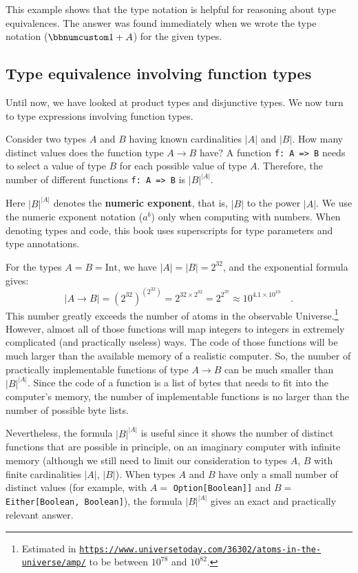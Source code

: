 This example shows that the type notation is helpful for reasoning
about type equivalences. The answer was found immediately when we
wrote the type notation ($\bbnum 1+A$) for the given types.

\subsection{Type equivalence involving function types}

Until now, we have looked at product types and disjunctive types.
We now turn to type expressions involving function types.

Consider two types $A$ and $B$ having known cardinalities $\left|A\right|$
and $\left|B\right|$. How many distinct values does the function
type $A\rightarrow B$ have? A function \lstinline!f: A => B! needs
to select a value of type $B$ for each possible value of type $A$.
Therefore, the number of different functions \lstinline!f: A => B!
is $\left|B\right|^{\left|A\right|}$. 

Here $\left|B\right|^{\left|A\right|}$ denotes the \textbf{numeric
exponent}, that is, $\left|B\right|$ to the power
$\left|A\right|$. We use the numeric exponent notation ($a^{b}$)
only when computing with numbers. When denoting types and code, this
book uses superscripts for type parameters and type annotations.

For the types $A=B=\text{Int}$, we have $\left|A\right|=\left|B\right|=2^{32}$,
and the exponential formula gives:
\[
\left|A\rightarrow B\right|=(2^{32})^{\left(2^{32}\right)}=2^{32\times2^{32}}=2^{2^{37}}\approx10^{4.1\times10^{10}}\quad.
\]
This number greatly exceeds the number of atoms in the observable
Universe.\footnote{Estimated in \texttt{\href{https://www.universetoday.com/36302/atoms-in-the-universe/amp/}{https://www.universetoday.com/36302/atoms-in-the-universe/amp/}}
to be between $10^{78}$ and $10^{82}$.} However, almost all of those functions will map integers to integers
in extremely complicated (and practically useless) ways. The code
of those functions will be much larger than the available memory of
a realistic computer. So, the number of practically implementable
functions of type $A\rightarrow B$ can be much smaller than $\left|B\right|^{\left|A\right|}$.
Since the code of a function is a list of bytes that needs to fit
into the computer\textsf{'}s memory, the number of implementable functions
is no larger than the number of possible byte lists.

Nevertheless, the formula $\left|B\right|^{\left|A\right|}$ is useful
since it shows the number of distinct functions that are possible
in principle, on an imaginary computer with infinite memory (although
we still need to limit our consideration to types $A$, $B$ with
finite cardinalities $\left|A\right|$, $\left|B\right|$). When types
$A$ and $B$ have only a small number of distinct values (for example,
with $A=$ \lstinline!Option[Boolean]]! and $B=$ \lstinline!Either[Boolean, Boolean]!),
the formula $\left|B\right|^{\left|A\right|}$ gives an exact and
practically relevant answer.

